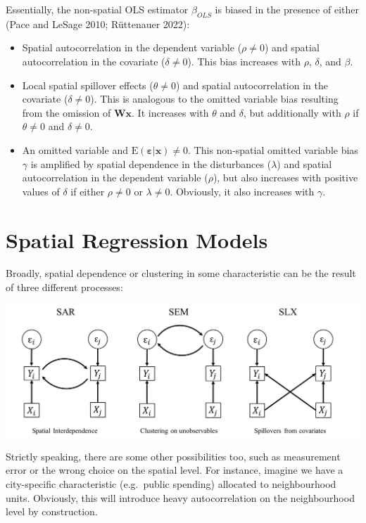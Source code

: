 \documentclass[
  letterpaper,
  DIV=11,
  numbers=noendperiod]{scrreprt}
\begin{document}
Essentially, the non-spatial OLS estimator \(\beta_{OLS}\) is biased in
the presence of either (Pace and LeSage 2010; Rüttenauer 2022):

\begin{itemize}
\item
  Spatial autocorrelation in the dependent variable (\(\rho\neq0\)) and
  spatial autocorrelation in the covariate (\(\delta\neq0\)). This bias
  increases with \(\rho\), \(\delta\), and \(\beta\).
\item
  Local spatial spillover effects (\(\theta\neq0\)) and spatial
  autocorrelation in the covariate (\(\delta\neq0\)). This is analogous
  to the omitted variable bias resulting from the omission of
  \({\boldsymbol{\mathbf{W}}} {\boldsymbol{\mathbf{x}}}\). It increases
  with \(\theta\) and \(\delta\), but additionally with \(\rho\) if
  \(\theta\neq0\) and \(\delta\neq0\).
\item
  An omitted variable and
  \(\mathrm{E}({\boldsymbol{\mathbf{\varepsilon}}}|{\boldsymbol{\mathbf{x}}})\neq0\).
  This non-spatial omitted variable bias \(\gamma\) is amplified by
  spatial dependence in the disturbances (\(\lambda\)) and spatial
  autocorrelation in the dependent variable (\(\rho\)), but also
  increases with positive values of \(\delta\) if either \(\rho\neq 0\)
  or \(\lambda\neq 0\). Obviously, it also increases with \(\gamma\).
\end{itemize}

\hypertarget{spatial-regression-models-1}{%
\section{Spatial Regression Models}\label{spatial-regression-models-1}}

Broadly, spatial dependence or clustering in some characteristic can be
the result of three different processes:

\includegraphics{fig/Graph.jpg}

Strictly speaking, there are some other possibilities too, such as
measurement error or the wrong choice on the spatial level. For
instance, imagine we have a city-specific characteristic (e.g.~public
spending) allocated to neighbourhood units. Obviously, this will
introduce heavy autocorrelation on the neighbourhood level by
construction.
\end{document}
